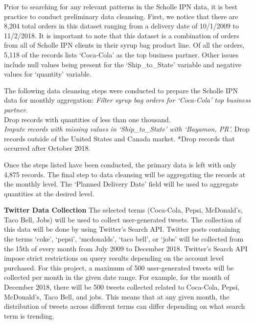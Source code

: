 \documentclass[12pt,oneside]{chicagocapstone}
\begin{document}
Prior to searching for any relevant patterns in the Scholle IPN data, it is best practice to conduct preliminary data cleansing. First, we notice that there are 8,204 total orders in this dataset ranging from a delivery date of 10/1/2009 to 11/2/2018. It is important to note that this dataset is a combination of orders from all of Scholle IPN clients in their syrup bag product line. Of all the orders, 5,118 of the records lists `Coca-Cola' as the top business partner. Other issues include null values being present for the `Ship\_to\_State' variable and negative values for `quantity' variable.

The following data cleansing steps were conducted to prepare the Scholle IPN data for monthly aggregation:
\emph{Filter syrup bag orders for `Coca-Cola' top business partner.\\
}Drop records with quantities of less than one thousand.\\
\emph{Impute records with missing values in `Ship\_to\_State' with `Bayamon, PR'.
}Drop records outside of the United States and Canada market.
*Drop records that occurred after October 2018.

Once the steps listed have been conducted, the primary data is left with only 4,875 records. The final step to data cleansing will be aggregating the records at the monthly level. The `Planned Delivery Date' field will be used to aggregate quantities at the desired level.

\textbf{Twitter Data Collection}
The selected terms (Coca-Cola, Pepsi, McDonald's, Taco Bell, Jobs) will be used to collect user-generated tweets. The collection of this data will be done by using Twitter's Search API. Twitter posts containing the terms `coke', `pepsi', `mcdonalds', `taco bell', or `jobs' will be collected from the 15th of every month from July 2009 to December 2018. Twitter's Search API impose strict restrictions on query results depending on the account level purchased. For this project, a maximum of 500 user-generated tweets will be collected per month in the given date range. For example, for the month of December 2018, there will be 500 tweets collected related to Coca-Cola, Pepsi, McDonald's, Taco Bell, and jobs. This means that at any given month, the distribution of tweets across different terms can differ depending on what search term is trending.
\end{document}
